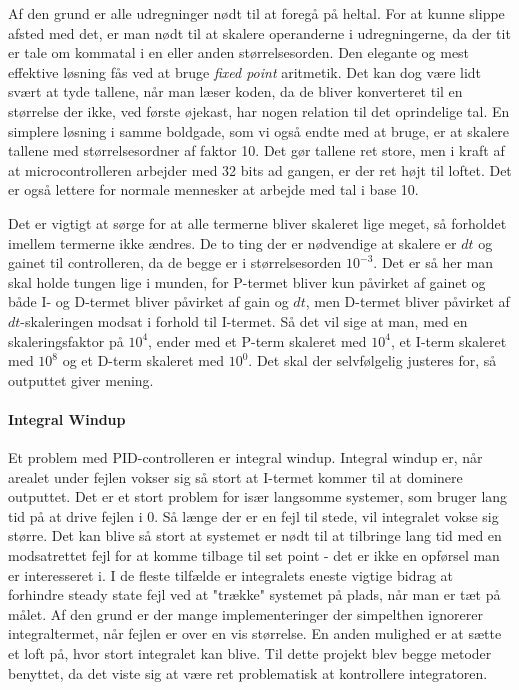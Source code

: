 Af den grund er alle udregninger nødt til at foregå på heltal. For at kunne slippe afsted med det, er man nødt til at skalere operanderne i udregningerne, da der tit er tale om kommatal i en eller anden størrelsesorden. Den elegante og mest effektive løsning fås ved at bruge \textit{fixed point} aritmetik. Det kan dog være lidt svært at tyde tallene, når man læser koden, da de bliver konverteret til en størrelse der ikke, ved første øjekast, har nogen relation til det oprindelige tal. En simplere løsning i samme boldgade, som vi også endte med at bruge, er at skalere tallene med størrelsesordner af faktor 10. Det gør tallene ret store, men i kraft af at microcontrolleren arbejder med 32 bits ad gangen, er der ret højt til loftet. Det er også lettere for normale mennesker at arbejde med tal i base 10.

Det er vigtigt at sørge for at alle termerne bliver skaleret lige meget, så forholdet imellem termerne ikke ændres. De to ting der er nødvendige at skalere er $dt$ og gainet til controlleren, da de begge er i størrelsesorden $10^{-3}$. Det er så her man skal holde tungen lige i munden, for P-termet bliver kun påvirket af gainet og både I- og D-termet bliver påvirket af gain og $dt$, men D-termet bliver påvirket af $dt$-skaleringen modsat i forhold til I-termet. Så det vil sige at man, med en skaleringsfaktor på $10^4$, ender med et P-term skaleret med $10^4$, et I-term skaleret med $10^8$ og et D-term skaleret med $10^0$. Det skal der selvfølgelig justeres for, så outputtet giver mening.

\paragraph{Integral Windup}

Et problem med PID-controlleren er integral windup. Integral windup er, når arealet under fejlen vokser sig så stort at I-termet kommer til at dominere outputtet. Det er et stort problem for især langsomme systemer, som bruger lang tid på at drive fejlen i 0. Så længe der er en fejl til stede, vil integralet vokse sig større. Det kan blive så stort at systemet er nødt til at tilbringe lang tid med en modsatrettet fejl for at komme tilbage til set point - det er ikke en opførsel man er interesseret i. I de fleste tilfælde er integralets eneste vigtige bidrag at forhindre steady state fejl ved at "trække" systemet på plads, når man er tæt på målet. Af den grund er der mange implementeringer der simpelthen ignorerer integraltermet, når fejlen er over en vis størrelse. En anden mulighed er at sætte et loft på, hvor stort integralet kan blive. Til dette projekt blev begge metoder benyttet, da det viste sig at være ret problematisk at kontrollere integratoren. 

